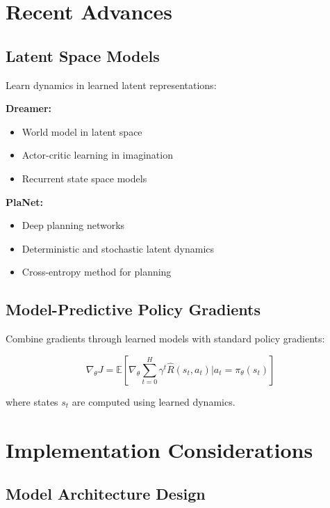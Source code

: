 \section{Recent Advances}

\subsection{Latent Space Models}

Learn dynamics in learned latent representations:

\textbf{Dreamer:}
\begin{itemize}
    \item World model in latent space
    \item Actor-critic learning in imagination
    \item Recurrent state space models
\end{itemize}

\textbf{PlaNet:}
\begin{itemize}
    \item Deep planning networks
    \item Deterministic and stochastic latent dynamics
    \item Cross-entropy method for planning
\end{itemize}

\subsection{Model-Predictive Policy Gradients}

Combine gradients through learned models with standard policy gradients:

\begin{equation}
\nabla_\theta J = \mathbb{E} \left[ \nabla_\theta \sum_{t=0}^H \gamma^t \hat{R}(s_t, a_t) \bigg| a_t = \pi_\theta(s_t) \right]
\end{equation}

where states $s_t$ are computed using learned dynamics.

\section{Implementation Considerations}

\subsection{Model Architecture Design}

